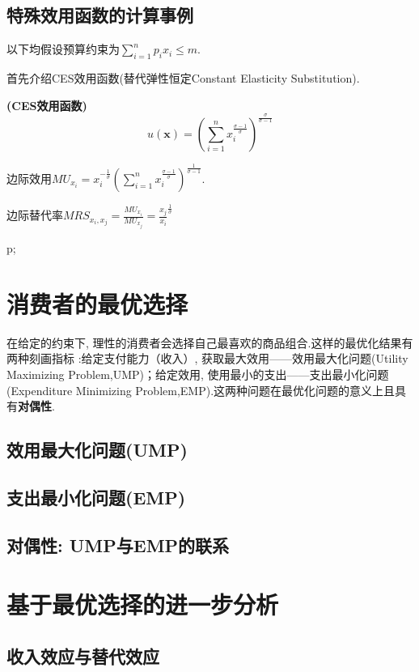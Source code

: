 \documentclass[lang=cn,10pt]{elegantbook}
\begin{document}
\subsection{特殊效用函数的计算事例}
以下均假设预算约束为$\sum_{i=1}^{n}p_ix_i\leq m$.

首先介绍CES效用函数(替代弹性恒定Constant Elasticity Substitution).
\begin{example}{\textbf{(CES效用函数)}}{}
    $$u(\textbf{x})=\left(\sum_{i=1}^{n}x_{i}^{\frac{\sigma-1}{\sigma}}\right)^{\frac{\sigma}{\sigma-1}}$$
\end{example}
边际效用$MU_{x_i}=x_i^{-\frac{1}{\sigma}}\left(\sum_{i=1}^{n}x_{i}^{\frac{\sigma-1}{\sigma}}\right)^{\frac{1}{\sigma-1}}$.

边际替代率$MRS_{x_i,x_j}=\frac{MU_{x_i}}{MU_{x_j}}=\frac{x_j}{x_i}^{\frac{1}{\sigma}}$

p;
\newpage
\section{消费者的最优选择}
在给定的约束下, 理性的消费者会选择自己最喜欢的商品组合.这样的最优化结果有两种刻画指标 :给定支付能力（收入）, 获取最大效用——效用最大化问题(Utility Maximizing Problem,UMP)；给定效用, 使用最小的支出——支出最小化问题(Expenditure Minimizing Problem,EMP).这两种问题在最优化问题的意义上且具有\textbf{对偶性}.

\subsection{效用最大化问题(UMP)}
\newpage

\subsection{支出最小化问题(EMP)}
\newpage

\subsection{对偶性: UMP与EMP的联系}
\newpage

\section{基于最优选择的进一步分析}
\newpage

\subsection{收入效应与替代效应}
\newpage
\end{document}
